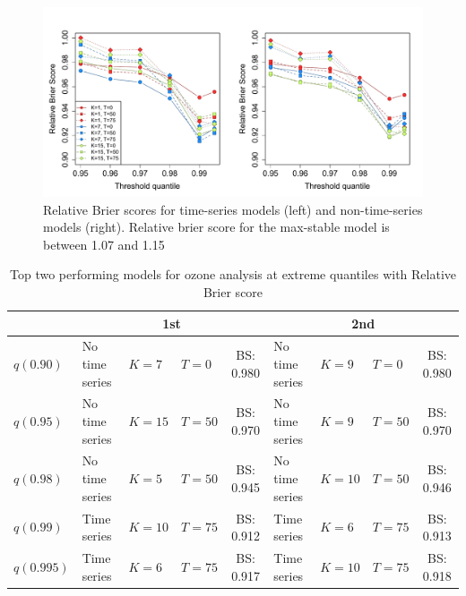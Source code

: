\documentclass[useAMS,usenatbib,referee]{biom}
\begin{document}
\begin{figure}
  \includegraphics[width=\linewidth]{plots/bs-ozone.pdf}
  \caption{Relative Brier scores for time-series models (left) and non-time-series models (right). Relative brier score for the max-stable model is between 1.07 and 1.15}
  \label{fig:bs-ozone}
\end{figure}
\begin{table}
  \small
  \caption{Top two performing models for ozone analysis at extreme quantiles with Relative Brier score}
  \label{tbl:ozoneresults}
  \centering
  \begin{tabular}{|l|l l l c|l l l c|}
    \cline{2-9}
    \multicolumn{1}{c|}{}  & \multicolumn{4}{c|}{1st} & \multicolumn{4}{c|}{2nd} \\
    \hline
    $q(0.90)$  & No time series & $K=7$  & $T=0$  & BS: 0.980 &
                 No time series & $K=9$  & $T=0$  & BS: 0.980 \\
    $q(0.95)$  & No time series & $K=15$ & $T=50$ & BS: 0.970 &
                 No time series & $K=9$  & $T=50$ & BS: 0.970\\
    $q(0.98)$  & No time series & $K=5$  & $T=50$ & BS: 0.945 &
                 No time series & $K=10$ & $T=50$ & BS: 0.946\\
    $q(0.99)$  & Time series    & $K=10$ & $T=75$ & BS: 0.912 &
                 Time series    & $K=6$  & $T=75$ & BS: 0.913\\
    $q(0.995)$ & Time series    & $K=6$  & $T=75$ & BS: 0.917 &
                 Time series    & $K=10$ & $T=75$ & BS: 0.918\\
    \hline
  \end{tabular}
\end{table}
\end{document}
